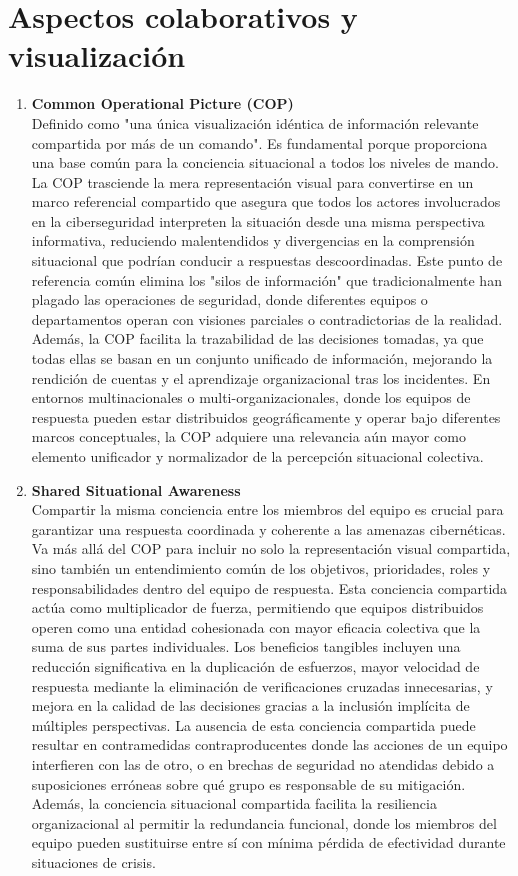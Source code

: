 \section{Aspectos colaborativos y visualización}
\begin{enumerate}
\item \textbf{Common Operational Picture (COP)} \\
Definido como "una única visualización idéntica de información relevante compartida por más de un comando". Es fundamental porque proporciona una base común para la conciencia situacional a todos los niveles de mando. La COP trasciende la mera representación visual para convertirse en un marco referencial compartido que asegura que todos los actores involucrados en la ciberseguridad interpreten la situación desde una misma perspectiva informativa, reduciendo malentendidos y divergencias en la comprensión situacional que podrían conducir a respuestas descoordinadas. Este punto de referencia común elimina los "silos de información" que tradicionalmente han plagado las operaciones de seguridad, donde diferentes equipos o departamentos operan con visiones parciales o contradictorias de la realidad. Además, la COP facilita la trazabilidad de las decisiones tomadas, ya que todas ellas se basan en un conjunto unificado de información, mejorando la rendición de cuentas y el aprendizaje organizacional tras los incidentes. En entornos multinacionales o multi-organizacionales, donde los equipos de respuesta pueden estar distribuidos geográficamente y operar bajo diferentes marcos conceptuales, la COP adquiere una relevancia aún mayor como elemento unificador y normalizador de la percepción situacional colectiva.

\item \textbf{Shared Situational Awareness} \\
Compartir la misma conciencia entre los miembros del equipo es crucial para garantizar una respuesta coordinada y coherente a las amenazas cibernéticas. Va más allá del COP para incluir no solo la representación visual compartida, sino también un entendimiento común de los objetivos, prioridades, roles y responsabilidades dentro del equipo de respuesta. Esta conciencia compartida actúa como multiplicador de fuerza, permitiendo que equipos distribuidos operen como una entidad cohesionada con mayor eficacia colectiva que la suma de sus partes individuales. Los beneficios tangibles incluyen una reducción significativa en la duplicación de esfuerzos, mayor velocidad de respuesta mediante la eliminación de verificaciones cruzadas innecesarias, y mejora en la calidad de las decisiones gracias a la inclusión implícita de múltiples perspectivas. La ausencia de esta conciencia compartida puede resultar en contramedidas contraproducentes donde las acciones de un equipo interfieren con las de otro, o en brechas de seguridad no atendidas debido a suposiciones erróneas sobre qué grupo es responsable de su mitigación. Además, la conciencia situacional compartida facilita la resiliencia organizacional al permitir la redundancia funcional, donde los miembros del equipo pueden sustituirse entre sí con mínima pérdida de efectividad durante situaciones de crisis.


\end{enumerate}
